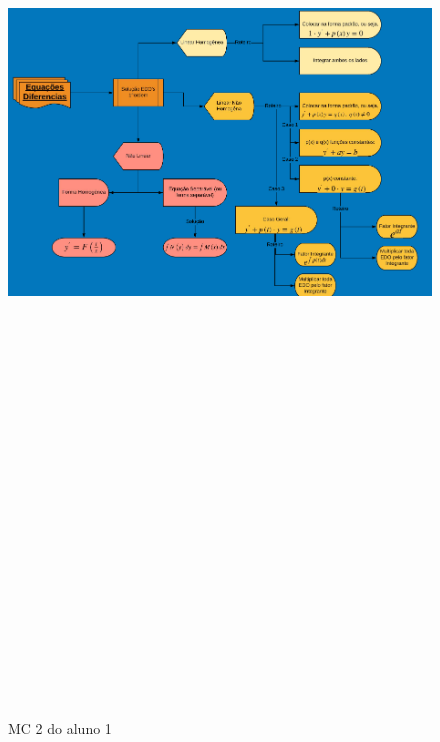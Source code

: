 \begin{landscape}
\begin{figure}[H]
\centering
\caption{MC 2 do aluno 1}
\includegraphics[width=220mm, height=290mm,keepaspectratio]{figuras/MC/mc1_2.png}
\label{mc2a1}
\end{figure}
\end{landscape}

